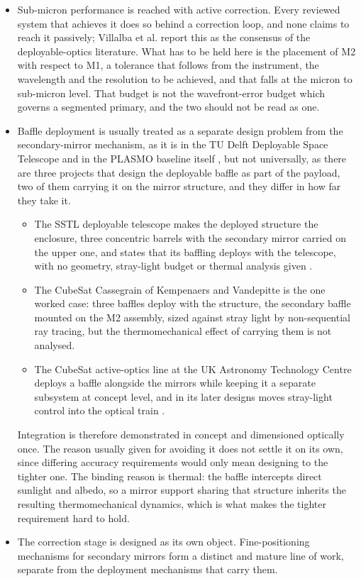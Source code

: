 \begin{itemize}
    \item Sub-micron performance is reached with active correction. Every reviewed system that achieves it does so behind a correction loop, and none claims to reach it passively; Villalba et al. \cite{villalba_review_2020} report this as the consensus of the deployable-optics literature. What has to be held here is the placement of M2 with respect to M1, a tolerance that follows from the instrument, the wavelength and the resolution to be achieved, and that falls at the micron to sub-micron level. That budget is not the wavefront-error budget which governs a segmented primary, and the two should not be read as one.
    \item Baffle deployment is usually treated as a separate design problem from the secondary-mirror mechanism, as it is in the TU Delft Deployable Space Telescope and in the PLASMO baseline itself \cite{nagy_design_2021, bouwmeester_enabling_2023}, but not universally, as there are three projects that design the deployable baffle as part of the payload, two of them carrying it on the mirror structure, and they differ in how far they take it.
    \begin{itemize}
        \item The SSTL deployable telescope makes the deployed structure the enclosure, three concentric barrels with the secondary mirror carried on the upper one, and states that its baffling deploys with the telescope, with no geometry, stray-light budget or thermal analysis given \cite{gooding_novel_2019, shore_new_2019}.
        \item The CubeSat Cassegrain of Kempenaers and Vandepitte \cite{kempenaers_deployable_2025} is the one worked case: three baffles deploy with the structure, the secondary baffle mounted on the M2 assembly, sized against stray light by non-sequential ray tracing, but the thermomechanical effect of carrying them is not analysed.
        \item The CubeSat active-optics line at the UK Astronomy Technology Centre deploys a baffle alongside the mirrors while keeping it a separate subsystem at concept level, and in its later designs moves stray-light control into the optical train \cite{schwartz_high-resolution_2020, schwartz_6u_2022, schwartz_high-resolution_2025}.
    \end{itemize}
    Integration is therefore demonstrated in concept and dimensioned optically once. The reason usually given for avoiding it does not settle it on its own, since differing accuracy requirements would only mean designing to the tighter one. The binding reason is thermal: the baffle intercepts direct sunlight and albedo, so a mirror support sharing that structure inherits the resulting thermomechanical dynamics, which is what makes the tighter requirement hard to hold.
    \item The correction stage is designed as its own object. Fine-positioning mechanisms for secondary mirrors form a distinct and mature line of work, separate from the deployment mechanisms that carry them.
\end{itemize}


